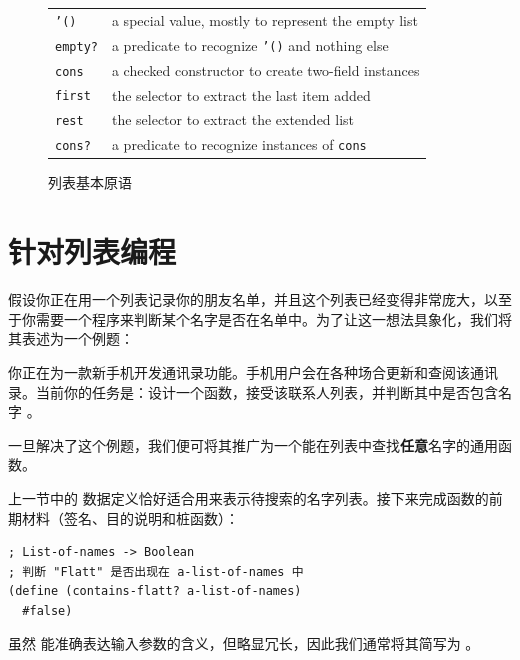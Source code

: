 \begin{figure}[htbp]
  \centering
  \begin{stepperbox}[unbreakable]
    \centering
    \scriptsize
    \begin{tabular}{ll}
      \toprule
      \texttt{'()} & a special value, mostly to represent the empty list \\
      \texttt{empty?} & a predicate to recognize \texttt{'()} and nothing else \\
      \texttt{cons} & a checked constructor to create two-field instances \\
      \texttt{first} & the selector to extract the last item added \\
      \texttt{rest} & the selector to extract the extended list \\
      \texttt{cons?} & a predicate to recognize instances of \texttt{cons} \\
      \bottomrule
    \end{tabular}
  \end{stepperbox}
  \caption{列表基本原语}
  \label{fig:list_primitives}
\end{figure}

\section{针对列表编程}
\label{sec:ch08_programming_with_lists}

假设你正在用一个列表记录你的朋友名单，并且这个列表已经变得非常庞大，以至于你需要一个程序来判断某个名字是否在名单中。为了让这一想法具象化，我们将其表述为一个例题：

\begin{notebox}[应用场景例题]
你正在为一款新手机开发通讯录功能。手机用户会在各种场合更新和查阅该通讯录。当前你的任务是：设计一个函数，接受该联系人列表，并判断其中是否包含名字 。
\end{notebox}

一旦解决了这个例题，我们便可将其推广为一个能在列表中查找\textbf{任意}名字的通用函数。

上一节中的  数据定义恰好适合用来表示待搜索的名字列表。接下来完成函数的前期材料（签名、目的说明和桩函数）：
\begin{lstlisting}[language=BSL]
; List-of-names -> Boolean
; 判断 "Flatt" 是否出现在 a-list-of-names 中
(define (contains-flatt? a-list-of-names)
  #false)
\end{lstlisting}

虽然  能准确表达输入参数的含义，但略显冗长，因此我们通常将其简写为 。


